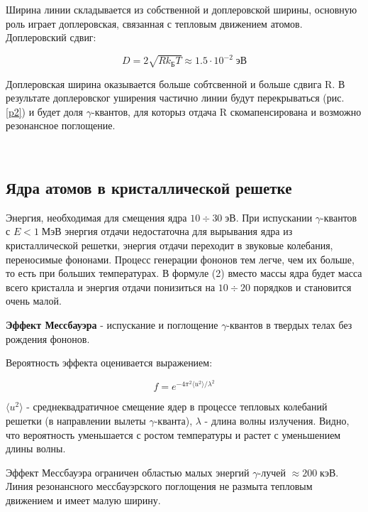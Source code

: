 \documentclass[a4paper]{article}
\begin{document}
Ширина линии складывается из собственной и доплеровской ширины, основную роль играет доплеровская, связанная с тепловым движением атомов.
Доплеровский сдвиг:

\begin{equation}
    D = 2 \sqrt{R k_Б T} \approx 1.5 \cdot 10^{-2} \; эВ
\end{equation}

Доплеровская ширина оказывается больше собтсвенной и больше сдвига R. В результате доплеровског уширения 
частично линии будут перекрываться (рис. \ref{p2}) и будет доля $\gamma$-квантов, для которыз отдача R скомапенсирована и возможно резонансное 
поглощение. 

\

\subsection{Ядра атомов в кристаллической решетке}

Энергия, необходимая для смещения ядра $10 \div 30 \;  эВ$. При испускании $\gamma$-квантов с $E < 1 \; МэВ$ энергия отдачи 
недостаточна для вырывания ядра из кристаллической решетки, энергия отдачи переходит в звуковые колебания, переносимые фононами. 
Процесс генерации фононов тем легче, чем их больше, то есть при больших температурах. В формуле (2) вместо массы ядра будет масса всего кристалла и 
энергия отдачи понизиться на $10 \div 20 $ порядков и становится очень малой. \par 

\textbf{Эффект Мессбауэра} - испускание и поглощение $\gamma$-квантов в твердых телах без рождения фононов.

Вероятность эффекта оценивается выражением:

\begin{equation}
    f = e^{-4 \pi^2 \langle u^2 \rangle / \lambda^2}
\end{equation}

$\langle u^2 \rangle$ - среднеквадратичное смещение ядер в процессе тепловых колебаний решетки (в направлении вылеты $\gamma$-кванта), 
$\lambda$ - длина волны излучения. Видно, что вероятность уменьшается с ростом температуры и растет с уменьшением длины волны. \par 

Эффект Мессбауэра ограничен областью малых энергий $\gamma$-лучей $\approx 200 \; кэВ$. Линия резонансного мессбауэрского поглощения 
не размыта тепловым движением и имеет малую ширину. \par 
\end{document}
